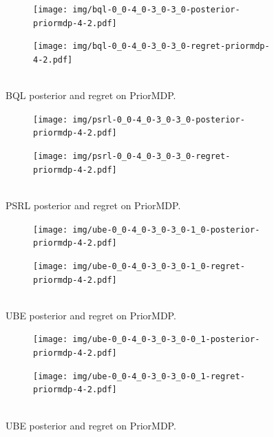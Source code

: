 \documentclass{article}
\begin{document}
\begin{appendices}
\begin{figure}[h!]
\centering
\begin{subfigure}{0.65\textwidth}
\texttt{[image: img/bql-0\_0-4\_0-3\_0-3\_0-posterior-priormdp-4-2.pdf]}
\end{subfigure}
\begin{subfigure}{0.34\textwidth}
\texttt{[image: img/bql-0\_0-4\_0-3\_0-3\_0-regret-priormdp-4-2.pdf]}~\\~\\
\end{subfigure}
\captionsetup{width=0.9\linewidth}
\caption{BQL posterior and regret on PriorMDP.}\label{bql_priormdp_visual}
\end{figure}

\begin{figure}[h!]
\centering
\begin{subfigure}{0.65\textwidth}
\texttt{[image: img/psrl-0\_0-4\_0-3\_0-3\_0-posterior-priormdp-4-2.pdf]}
\end{subfigure}
\begin{subfigure}{0.34\textwidth}
\texttt{[image: img/psrl-0\_0-4\_0-3\_0-3\_0-regret-priormdp-4-2.pdf]}~\\~\\
\end{subfigure}
\captionsetup{width=0.9\linewidth}
\caption{PSRL posterior and regret on PriorMDP.}\label{psrl_priormdp_visual}
\end{figure}

\begin{figure}[h!]
\centering
\begin{subfigure}{0.65\textwidth}
\texttt{[image: img/ube-0\_0-4\_0-3\_0-3\_0-1\_0-posterior-priormdp-4-2.pdf]}
\end{subfigure}
\begin{subfigure}{0.34\textwidth}
\texttt{[image: img/ube-0\_0-4\_0-3\_0-3\_0-1\_0-regret-priormdp-4-2.pdf]}~\\~\\
\end{subfigure}
\captionsetup{width=0.9\linewidth}
\caption{UBE posterior and regret on PriorMDP.}\label{ube_priormdp_visual1}
\end{figure}

\begin{figure}[h!]
\centering
\begin{subfigure}{0.65\textwidth}
\texttt{[image: img/ube-0\_0-4\_0-3\_0-3\_0-0\_1-posterior-priormdp-4-2.pdf]}
\end{subfigure}
\begin{subfigure}{0.34\textwidth}
\texttt{[image: img/ube-0\_0-4\_0-3\_0-3\_0-0\_1-regret-priormdp-4-2.pdf]}~\\~\\
\end{subfigure}
\captionsetup{width=0.9\linewidth}
\caption{UBE posterior and regret on PriorMDP.}\label{ube_priormdp_visual1}
\end{figure}


\end{appendices}
\end{document}
